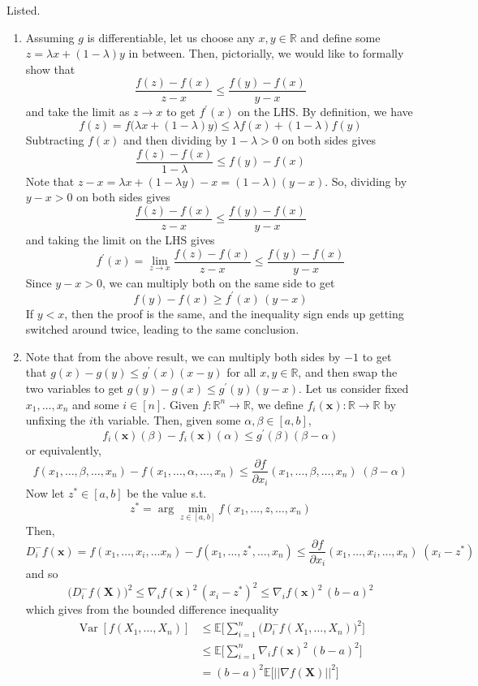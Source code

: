 \documentclass{article}
\DeclareMathOperator{\Var}{Var}
\begin{document}
\begin{solution}
Listed. 
\begin{enumerate}
    \item Assuming $g$ is differentiable, let us choose any $x, y \in \mathbb{R}$ and define some $z = \lambda x + (1 - \lambda)y$ in between. Then, pictorially, we would like to formally show that 
    \[\frac{f(z) - f(x)}{z - x} \leq \frac{f(y) - f(x)}{y - x}\]
    and take the limit as $z \rightarrow x$ to get $f^\prime(x)$ on the LHS. By definition, we have 
    \[f(z) = f\big( \lambda x + (1 - \lambda) y\big) \leq \lambda f(x) + (1 - \lambda) f(y)\]
    Subtracting $f(x)$ and then dividing by $1 - \lambda > 0$ on both sides gives 
    \[\frac{f(z) - f(x)}{1 - \lambda} \leq f(y) - f(x)\] 
    Note that $z - x = \lambda x + (1 - \lambda y) - x = (1 - \lambda)(y - x)$. So, dividing by $y - x > 0$ on both sides gives 
    \[\frac{f(z) - f(x)}{z - x} \leq \frac{f(y) - f(x)}{y - x}\]
    and taking the limit on the LHS gives 
    \[f^\prime (x) = \lim_{z \rightarrow x} \frac{f(z) - f(x)}{z - x} \leq \frac{f(y) - f(x)}{y - x}\]
    Since $y - x > 0$, we can multiply both on the same side to get 
    \[f(y) - f(x) \geq f^\prime (x) \, (y - x)\]
    If $y < x$, then the proof is the same, and the inequality sign ends up getting switched around twice, leading to the same conclusion. 
    
    \item Note that from the above result, we can multiply both sides by $-1$ to get that $g(x) - g(y) \leq g^\prime (x) (x - y)$ for all $x, y \in \mathbb{R}$, and then swap the two variables to get $g(y) - g(x) \leq g^\prime (y) (y - x)$. Let us consider fixed $x_1, \ldots, x_n$ and some $i \in [n]$. Given $f: \mathbb{R}^n \rightarrow \mathbb{R}$, we define $f_i (\mathbf{x}): \mathbb{R} \rightarrow \mathbb{R}$ by unfixing the $i$th variable. Then, given some $\alpha, \beta \in [a, b]$, 
    \[f_i (\mathbf{x}) (\beta) - f_i (\mathbf{x}) (\alpha) \leq g^\prime (\beta) (\beta - \alpha)\]
    or equivalently, 
    \[f(x_1, \ldots, \beta, \ldots, x_n) - f(x_1, \ldots, \alpha, \ldots, x_n) \leq \frac{\partial f}{\partial x_i} (x_1, \ldots, \beta, \ldots, x_n) \; (\beta - \alpha)\]
    Now let $z^\ast \in [a, b]$ be the value s.t. 
    \[z^\ast = \arg \min_{z \in [a, b]} f(x_1, \ldots, z, \ldots, x_n) \]
    Then, 
    \[D_i^- f(\mathbf{x}) = f(x_1, \ldots, x_i, \ldots x_n) - f(x_1, \ldots, z^\ast, \ldots, x_n) \leq \frac{\partial f}{\partial x_i} (x_1, \ldots, x_i, \ldots, x_n) \; (x_i - z^\ast)\]
    and so 
    \[\big( D_i^- f(\mathbf{X}) \big)^2 \leq \nabla_i f (\mathbf{x})^2 \, (x_i - z^\ast)^2 \leq \nabla_i f (\mathbf{x})^2 \, (b - a)^2\]
    which gives from the bounded difference inequality 
    \begin{align*}
        \Var[f(X_1, \ldots, X_n)] & \leq \mathbb{E} \bigg[ \sum_{i=1}^n \big( D_i^- f(X_1, \ldots, X_n) \big)^2 \bigg] \\
        & \leq \mathbb{E} \bigg[ \sum_{i=1}^n \nabla_i f (\mathbf{x})^2 \, (b - a)^2 \bigg] \\
        & = (b - a)^2 \mathbb{E} \big[ \big| \big| \nabla f(\mathbf{X})\big| \big|^2 \big]
    \end{align*}
    

\end{enumerate}
\end{solution}
\end{document}
